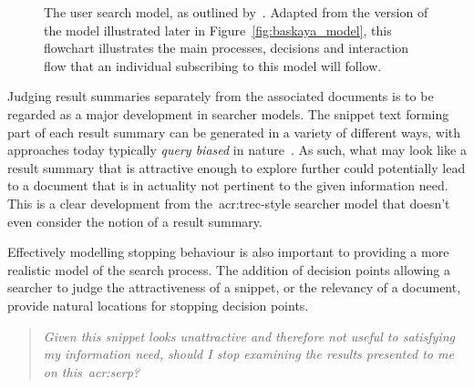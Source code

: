 \begin{figure}[t!]
    \centering
    \caption[Flowchart of the search process by~\cite{baskaya2013behavioural_factors}]{The user search model, as outlined by~\cite{baskaya2013behavioural_factors}. Adapted from the version of the model illustrated later in Figure~\ref{fig:baskaya_model}, this flowchart illustrates the main processes, decisions and interaction flow that an individual subscribing to this model will follow.}
    \label{fig:baskaya_model_flow}
\end{figure}

Judging result summaries separately from the associated documents is to be regarded as a major development in searcher models. The snippet text forming part of each result summary can be generated in a variety of different ways, with approaches today typically \emph{query biased} in nature~\citep{tombros1998query_biased}. As such, what may look like a result summary that is attractive enough to explore further could potentially lead to a document that is in actuality not pertinent to the given information need. This is a clear development from the~\gls{acr:trec}-style searcher model that doesn't even consider the notion of a result summary.

Effectively modelling stopping behaviour is also important to providing a more realistic model of the search process. The addition of decision points allowing a searcher to judge the attractiveness of a snippet, or the relevancy of a document, provide natural locations for stopping decision points.

\begin{quote}
\emph{Given this snippet looks unattractive and therefore not useful to satisfying my information need, should I stop examining the results presented to me on this~\gls{acr:serp}?}
\end{quote}

